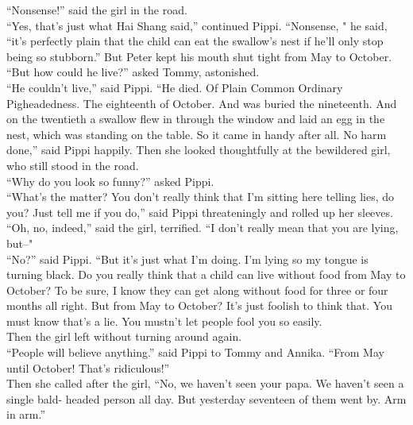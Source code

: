 \documentclass{standard}
\begin{document}
“Nonsense!” said the girl in the road.\\

“Yes, that’s just what Hai Shang said,” continued Pippi. “Nonsense, " he said, “it’s perfectly plain that the child can eat the swallow’s nest if he’ll only stop being so stubborn.” But Peter kept his mouth shut tight from May to October.\\

“But how could he live?” asked Tommy, astonished.\\

“He couldn’t live,” said Pippi. “He died. Of Plain Common Ordinary Pigheadedness. The eighteenth of October. And was buried the nineteenth. And on the twentieth a swallow flew in through the window and laid an egg in the nest, which was standing on the table. So it came in handy after all. No harm done,” said Pippi happily. Then she looked thoughtfully at the bewildered girl, who still stood in the road.\\

“Why do you look so funny?” asked Pippi.\\

“What’s the matter? You don’t really think that I’m sitting here telling lies, do you? Just tell me if you do,” said Pippi threateningly and rolled up her sleeves.\\

“Oh, no, indeed,” said the girl, terrified. “I don’t really mean that you are lying, but--"\\

“No?” said Pippi. “But it’s just what I’m doing. I’m lying so my tongue is turning black. Do you really think that a child can live without food from May to October? To be sure, I know they can get along without food for three or four months all right. But from May to October? It’s just foolish to think that. You must know that’s a lie. You mustn’t let people fool you so easily.\\

Then the girl left without turning around again.\\

“People will believe anything.” said Pippi to Tommy and Annika. “From May until October! That’s ridiculous!”\\

Then she called after the girl, “No, we haven’t seen your papa. We haven’t seen a single bald- headed person all day. But yesterday seventeen of them went by. Arm in arm.”\\
\end{document}
